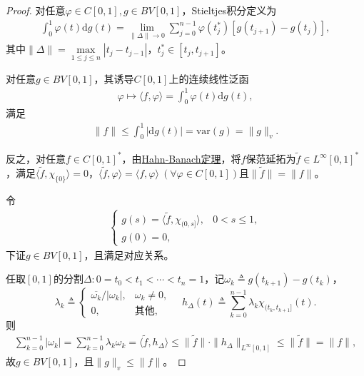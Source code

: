 \documentclass[../../main.tex]{subfiles}%
\begin{document}
\begin{proof}
对任意$\varphi\in C[0,1],g\in BV[0,1]$，Stieltjes积分定义为
\begin{align*}
\int_{0}^{1}\varphi(t)\mathrm{d}g(t)=\lim\limits_{\|\Delta\|\to0}\sum\limits_{j=0}^{n-1}\varphi(t_j^*)[g(t_{j+1})-g(t_j)],
\end{align*}
其中$\|\Delta\|=\max\limits_{1\leqslant j\leqslant n}|t_j-t_{j-1}|$，$t_j^*\in[t_j,t_{j+1}]$。

对任意$g\in BV[0,1]$，其诱导$C[0,1]$上的连续线性泛函
\begin{align*}
\varphi\mapsto\langle f,\varphi\rangle=\int_{0}^{1}\varphi(t)\mathrm{d}g(t),
\end{align*}
满足
\begin{align}
\|f\|\leqslant\int_{0}^{1}|\mathrm{d}g(t)|=\mathrm{var}(g)=\|g\|_v.\label{eq:bstieltnorm}
\end{align}

反之，对任意$f\in C[0,1]^*$，由\hyperref[theorem:泛函分析--(哈恩-巴拿赫)Hahn-Banach定理]{Hahn-Banach定理}，将$f$保范延拓为$\widetilde{f}\in L^\infty[0,1]^*$，满足$\langle\widetilde{f},\chi_{\{0\}}\rangle=0$，$\langle\widetilde{f},\varphi\rangle=\langle f,\varphi\rangle\ (\forall\varphi\in C[0,1])$且$\|\widetilde{f}\|=\|f\|$。

令
\begin{align*}
\begin{cases}
g(s)=\langle\widetilde{f},\chi_{(0,s]}\rangle,&0<s\leqslant1,\\
g(0)=0,
\end{cases}
\end{align*}
下证$g\in BV[0,1]$，且满足对应关系。

任取$[0,1]$的分割$\Delta:0=t_0<t_1<\cdots<t_n=1$，记$\omega_k\triangleq g(t_{k+1})-g(t_k)$，
\[
\lambda_k\triangleq
\begin{cases}
\overline{\omega_k}/|\omega_k|,&\omega_k\neq0,\\
0,&\text{其他},
\end{cases}
\quad
h_\Delta(t)\triangleq\sum\limits_{k=0}^{n-1}\lambda_k\chi_{(t_k,t_{k+1}]}(t).
\]
则
\begin{align*}
\sum\limits_{k=0}^{n-1}|\omega_k|=\sum\limits_{k=0}^{n-1}\lambda_k\omega_k=\langle\widetilde{f},h_\Delta\rangle
\leqslant\|\widetilde{f}\|\cdot\|h_\Delta\|_{L^\infty[0,1]}\leqslant\|\widetilde{f}\|=\|f\|,
\end{align*}
故$g\in BV[0,1]$，且$\|g\|_v\leqslant\|f\|$。


\end{proof}
\end{document}
